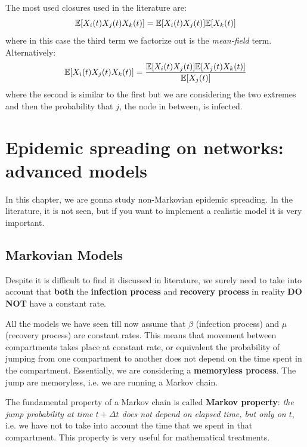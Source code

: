 \documentclass[../main/main.tex]{subfiles}
\begin{document}
The most used closures used in the literature are:
\begin{equation*}
   \mathbb{E} \qty[X_i (t) X_j (t) X_k (t)]   =  \mathbb{E} \qty[X_i (t) X_j (t)]  \mathbb{E}[X_k (t)]
\end{equation*}
where in this case the third term we factorize out is the \textit{mean-field} term. Alternatively:
\begin{equation*}
  \mathbb{E} \qty[X_i (t) X_j (t) X_k (t)]   = \frac{\mathbb{E} \qty[X_i (t) X_j (t)] \mathbb{E}[X_j (t) X_k (t)]  }{\mathbb{E}[X_j (t)]}
\end{equation*}
where the second is similar to the first but we are considering the two extremes and then the probability that \( j \), the node in between, is infected.














\chapter{Epidemic spreading on networks: advanced models}

In this chapter, we are gonna study non-Markovian epidemic spreading. In the literature, it is not seen, but if you want to implement a realistic model it is very important.

\section{Markovian Models}

Despite it is difficult to find it discussed in literature, we surely need to take into account that \textbf{both} the \textbf{infection process} and \textbf{recovery process} in reality \textbf{DO NOT} have a constant rate.

All the models we have seen till now assume that \( \beta  \) (infection process) and \( \mu  \) (recovery process) are constant rates.
This means that movement between compartments takes place at constant rate, or equivalent the probability of jumping from one compartment to another does not depend on the time spent in the compartment. Essentially, we are considering a \textbf{memoryless process}.
The jump are memoryless, i.e. we are running a Markov chain.

The fundamental property of a Markov chain is called \textbf{Markov property}: \emph{the jump probability at time \( t + \Delta t \) does not depend on elapsed time, but only on \( t \)}, i.e. we have not to take into account the time that we spent in that compartment.
This property is very useful for mathematical treatments.
\end{document}
